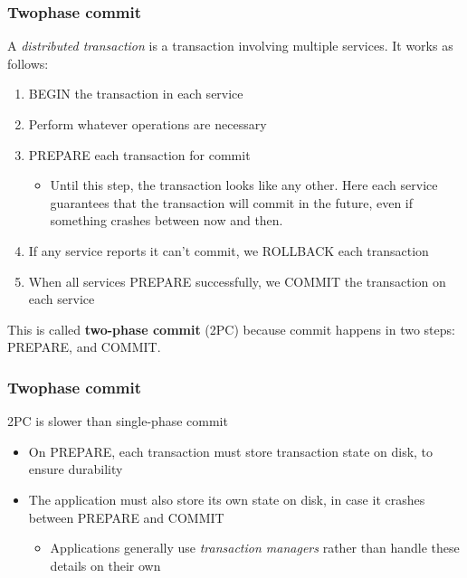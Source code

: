\documentclass[svgnames]{beamer}
\begin{document}
\begin{frame}
    \frametitle{Two\textendash phase commit}
    A \textit{distributed transaction} is a transaction involving multiple services. It works as follows:
    \begin{enumerate}
        \item BEGIN the transaction in each service
        \item Perform whatever operations are necessary
        \item PREPARE each transaction for commit
        \begin{itemize}
            \item Until this step, the transaction looks like any other. Here
            each service guarantees that the transaction will commit in the
            future, even if something crashes between now and then.
        \end{itemize}
        \item If any service reports it can't commit, we ROLLBACK each transaction
        \item When all services PREPARE successfully, we COMMIT the transaction on each service
    \end{enumerate}
    This is called \textbf{two-phase commit} (2PC) because commit happens in two steps: PREPARE, and COMMIT.
\end{frame}

\begin{frame}
    \frametitle{Two\textendash phase commit}
    2PC is slower than single-phase commit
    \begin{itemize}
        \item On PREPARE, each transaction must store transaction state on
        disk, to ensure durability
        \item The application must also store its own state on disk, in case it
        crashes between PREPARE and COMMIT
        \begin{itemize}
            \item Applications generally use \textit{transaction managers}
            rather than handle these details on their own
        \end{itemize}
    \end{itemize}
\end{frame}
\end{document}
